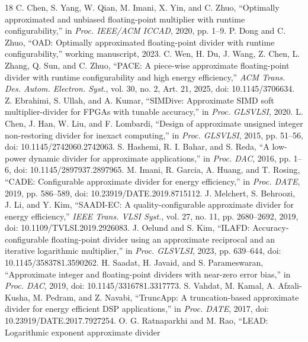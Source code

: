 \documentclass[conference]{IEEEtran}
\begin{document}
\begin{thebibliography}{18}
C. Chen, S. Yang, W. Qian, M. Imani, X. Yin, and C. Zhuo,
``Optimally approximated and unbiased floating-point multiplier with runtime
configurability,'' in \emph{Proc. IEEE/ACM ICCAD}, 2020, pp. 1--9.
P. Dong and C. Zhuo, ``OAD: Optimally approximated floating-point divider
with runtime configurability,'' working manuscript, 2023.
C. Wen, H. Du, J. Wang, Z. Chen, L. Zhang, Q. Sun, and C. Zhuo,
``PACE: A piece-wise approximate floating-point divider with runtime
configurability and high energy efficiency,'' \emph{ACM Trans. Des. Autom.
Electron. Syst.}, vol. 30, no. 2, Art. 21, 2025,
doi: 10.1145/3706634.
Z. Ebrahimi, S. Ullah, and A. Kumar, ``SIMDive: Approximate SIMD soft
multiplier-divider for FPGAs with tunable accuracy,'' in \emph{Proc. GLSVLSI},
2020.
L. Chen, J. Han, W. Liu, and F. Lombardi, ``Design of approximate unsigned
integer non-restoring divider for inexact computing,'' in \emph{Proc. GLSVLSI},
2015, pp. 51--56, doi: 10.1145/2742060.2742063.
S. Hashemi, R. I. Bahar, and S. Reda, ``A low-power dynamic divider for
approximate applications,'' in \emph{Proc. DAC}, 2016, pp. 1--6,
doi: 10.1145/2897937.2897965.
M. Imani, R. Garcia, A. Huang, and T. Rosing, ``CADE: Configurable approximate
divider for energy efficiency,'' in \emph{Proc. DATE}, 2019, pp. 586--589,
doi: 10.23919/DATE.2019.8715112.
J. Melchert, S. Behroozi, J. Li, and Y. Kim, ``SAADI-EC: A quality-configurable
approximate divider for energy efficiency,'' \emph{IEEE Trans. VLSI Syst.},
vol. 27, no. 11, pp. 2680--2692, 2019,
doi: 10.1109/TVLSI.2019.2926083.
J. Oelund and S. Kim, ``ILAFD: Accuracy-configurable floating-point divider
using an approximate reciprocal and an iterative logarithmic multiplier,'' in
\emph{Proc. GLSVLSI}, 2023, pp. 639--644,
doi: 10.1145/3583781.3590262.
H. Saadat, H. Javaid, and S. Parameswaran, ``Approximate integer and
floating-point dividers with near-zero error bias,'' in \emph{Proc. DAC},
2019, doi: 10.1145/3316781.3317773.
S. Vahdat, M. Kamal, A. Afzali-Kusha, M. Pedram, and Z. Navabi,
``TruncApp: A truncation-based approximate divider for energy efficient DSP
applications,'' in \emph{Proc. DATE}, 2017,
doi: 10.23919/DATE.2017.7927254.
O. G. Ratnaparkhi and M. Rao, ``LEAD: Logarithmic exponent approximate divider

\end{thebibliography}
\end{document}
